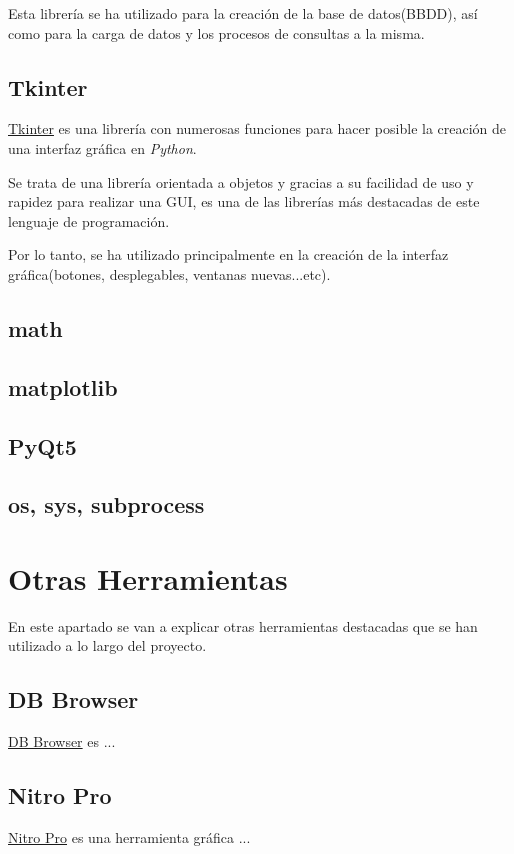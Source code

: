 Esta librería se ha utilizado para la creación de la base de datos(BBDD), así como para la carga de datos y los procesos de consultas a la misma.

\subsection{Tkinter}
\href{https://docs.python.org/2/library/tkinter.html}{Tkinter} es una librería con numerosas funciones para hacer posible la creación de una interfaz gráfica en \emph{Python}.

Se trata de una librería orientada a objetos y gracias a su facilidad de uso y rapidez para realizar una GUI, es una de las librerías más destacadas de este lenguaje de programación.

Por lo tanto, se ha utilizado principalmente en la creación de la interfaz gráfica(botones, desplegables, ventanas nuevas...etc).


\subsection{math}

\subsection{matplotlib}

\subsection{PyQt5}

\subsection{os, sys, subprocess}


\section{Otras Herramientas}\label{otras_herramientas}
En este apartado se van a explicar otras herramientas destacadas que se han utilizado a lo largo del proyecto.

\subsection{DB Browser}\label{db_browser}
\href{https://sqlitebrowser.org/}{DB Browser} es ...

\subsection{Nitro Pro}\label{nitro_pro}
\href{https://www.gonitro.com/es/}{Nitro Pro} es una herramienta gráfica ...

